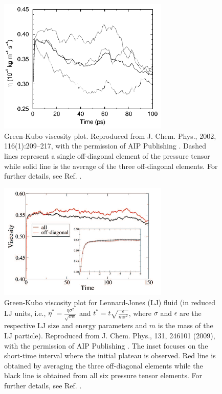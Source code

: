 \documentclass[9pt,bestpractices]{livecoms}
\begin{document}
\begin{figure}[htb!]
	\centering
	\includegraphics[width=3.2in]{HessFig5.png}
	\caption{Green-Kubo viscosity plot. Reproduced from J. Chem. Phys., 2002, 116(1):209--217, with the permission of AIP Publishing \cite{Hess2002}. Dashed lines represent a single off-diagonal element of the pressure tensor while solid line is the average of the three off-diagonal elements. For further details, see Ref. \cite{Hess2002}.}
	\label{fig:HessFig5}
\end{figure}

\begin{figure}[htb!]
	\centering
	\includegraphics[width=3.2in]{ChenFig1.png}
	\caption{Green-Kubo viscosity plot for Lennard-Jones (LJ) fluid (in reduced LJ units, i.e., $\eta^* = \frac{\eta \sigma^2}{\sqrt{m \epsilon}}$ and $t^* = t \sqrt{\frac{\epsilon}{m \sigma^2}}$, where $\sigma$ and $\epsilon$ are the respective LJ size and energy parameters and $m$ is the mass of the LJ particle). Reproduced from J. Chem. Phys., 131, 246101 (2009), with the permission of AIP Publishing \cite{Chen2009}. The inset focuses on the short-time interval where the initial plateau is observed. Red line is obtained by averaging the three off-diagonal elements while the black line is obtained from all six pressure tensor elements. For further details, see Ref. \cite{Chen2009}.}
	\label{fig:ChenFig1}
\end{figure}
\end{document}
